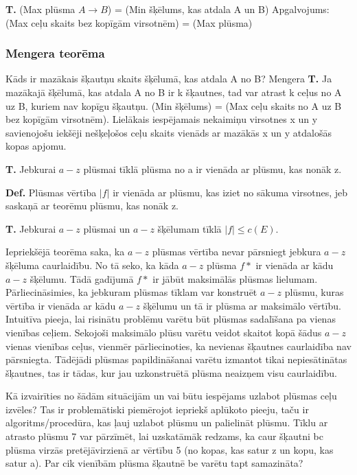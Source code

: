 \documentclass{article}
\begin{document}
\textbf{T. }(Max plūsma $A \to B$) = (Min šķēlums, kas atdala A un B)
Apgalvojums: (Max ceļu skaits bez kopīgām virsotnēm) = (Max plūsma)
\subsubsection{Mengera teorēma}

Kāds ir mazākais šķautņu skaits šķēlumā, kas atdala A no B?
Mengera \textbf{T. } Ja mazākajā šķēlumā, kas atdala A no B ir k šķautnes, tad var atrast k ceļus no A uz B, kuriem nav kopīgu šķautņu.  (Min šķēlums) = (Max ceļu skaits no A uz B bez kopīgām virsotnēm). Lielākais iespējamais nekaimiņu virsotnes x un y savienojošu iekšēji nešķeļošos ceļu skaits vienāds ar mazākās x un y atdalošās kopas apjomu.


\textbf{T. } Jebkurai $a-z$ plūsmai tīklā plūsma no a ir vienāda ar plūsmu, kas nonāk z.

\textbf{Def.} Plūsmas vērtība $|f |$ ir vienāda ar plūsmu, kas iziet no sākuma virsotnes, jeb saskaņā ar teorēmu plūsmu, kas nonāk z.

\textbf{T. }Jebkurai $a-z$ plūsmai un $ a-z$ šķēlumam tīklā $|f | \le c(E )$.

Iepriekšējā teorēma saka, ka $a-z$ plūsmas vērtība nevar pārsniegt jebkura $a-z$ šķēluma caurlaidību. No tā seko, ka kāda $a-z$ plūsma $f*$ ir vienāda ar kādu $a-z$ šķēlumu. Tādā gadījumā $f*$ ir jābūt maksimālās plūsmas lielumam. Pārliecināsimies, ka jebkuram plūsmas tīklam var konstruēt $a-z$ plūsmu, kuras vērtība ir vienāda ar kādu $a-z$ šķēlumu un tā ir plūsma ar maksimālo vērtību.
Intuitīva pieeja, lai risinātu problēmu varētu būt plūsmas sadalīšana pa vienas vienības ceļiem.  Sekojoši maksimālo plūsu varētu veidot skaitot kopā šādus $a-z$ vienas vienības ceļus, vienmēr pārliecinoties, ka nevienas šķautnes caurlaidība nav pārsniegta.  Tādējādi plūsmas papildināšanai varētu izmantot tikai nepiesātinātas šķautnes, tas ir tādas, kur jau uzkonstruētā plūsma neaizņem visu caurlaidību.

Kā izvairīties no šādām situācijām un vai būtu iespējams uzlabot plūsmas ceļu izvēles? Tas ir problemātiski piemērojot iepriekš aplūkoto pieeju, taču ir algoritms/procedūra, kas ļauj uzlabot plūsmu un palielināt plūsmu.  Tīklu ar atrasto plūsmu 7 var pārzīmēt, lai uzskatāmāk redzams, ka caur šķautni bc plūsma virzās pretējāvirzienā ar vērtību 5 (no kopas, kas satur z un kopu, kas satur a).  Par cik vienībām plūsma šķautnē be varētu tapt samazināta?
\end{document}
